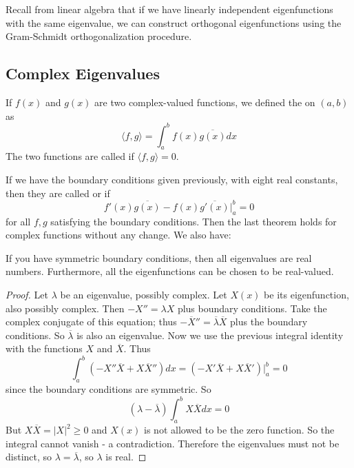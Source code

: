 Recall from linear algebra that if we have linearly independent eigenfunctions with the same eigenvalue, we can construct orthogonal eigenfunctions using the Gram-Schmidt orthogonalization procedure. 

\subsection{Complex Eigenvalues}

\begin{definition}
    If $f(x)$ and $g(x)$ are two complex-valued functions, we defined the  on $(a,b)$ as \begin{equation}
        \boxed{\langle f,g\rangle = \int_a^bf(x)\overline{g(x)}dx}
    \end{equation}
    The two functions are called  if $\langle f,g\rangle = 0$.
\end{definition}

If we have the boundary conditions given previously, with eight real constants, then they are called  or  if \begin{equation}
    \boxed{f'(x)\overline{g(x)}-f(x)\overline{g'(x)}\Bigg\rvert_a^b=0}
\end{equation}
for all $f,g$ satisfying the boundary conditions. Then the last theorem holds for complex functions without any change. We also have:

\begin{theorem}
    If you have symmetric boundary conditions, then all eigenvalues are real numbers. Furthermore, all the eigenfunctions can be chosen to be real-valued.
\end{theorem}
\begin{proof}
    Let $\lambda$ be an eigenvalue, possibly complex. Let $X(x)$ be its eigenfunction, also possibly complex. Then $-X'' = \lambda X$ plus boundary conditions. Take the complex conjugate of this equation; thus $-\overline{X}'' = \overline{\lambda}\overline{X}$ plus the boundary conditions. So $\overline{\lambda}$ is also an eigenvalue. Now we use the previous integral identity with the functions $X$ and $\overline{X}$. Thus \begin{equation*}
        \int_a^b(-X''\overline{X}+X\overline{X}'')dx = (-X'\overline{X}+X\overline{X}')\Bigg\rvert_a^b = 0
    \end{equation*}
    since the boundary conditions are symmetric. So \begin{equation*}
        (\lambda - \overline{\lambda})\int_a^bX\overline{X}dx = 0
    \end{equation*}
    But $X\overline{X}=|X|^2 \geq 0$ and $X(x)$ is not allowed to be the zero function. So the integral cannot vanish - a contradiction. Therefore the eigenvalues must not be distinct, so $\lambda = \overline{\lambda}$, so $\lambda$ is real.
\end{proof}

